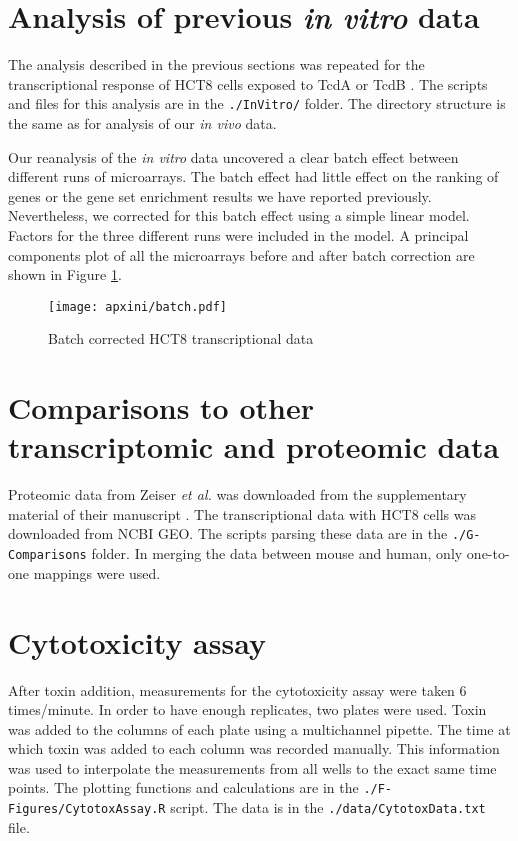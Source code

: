\section{Analysis of previous \emph{in vitro} data}

The analysis described in the previous sections was repeated for the transcriptional
response of HCT8 cells exposed to TcdA or TcdB \cite{DAuria:2012bd}. The scripts and files for this
analysis are in the \texttt{./InVitro/} folder. The directory structure is the same
as for analysis of our \emph{in vivo} data.

Our reanalysis of the \emph{in vitro} data uncovered a clear
batch effect between different runs of microarrays. The batch effect had little
effect on the ranking of genes or the gene set enrichment results we have
reported previously. Nevertheless, we corrected for this batch effect using
a simple linear model. Factors for the three different runs were included in the
model. A principal components plot of all the microarrays before and after 
batch correction are shown in Figure \ref{fig:batch}.

\begin{figure}[ht]
\centering
\texttt{[image: apxini/batch.pdf]}
\caption{Batch corrected HCT8 transcriptional data}
\label{fig:batch}
\end{figure}

\section{Comparisons to other transcriptomic and proteomic data}

Proteomic data from Zeiser \emph{et al.} was downloaded from the supplementary
material of their manuscript \cite{Zeiser:2013cu}. The transcriptional data with HCT8 cells was
downloaded from NCBI GEO. The scripts parsing these data are in the
\texttt{./G-Comparisons} folder. In merging the data between mouse and human, 
only one-to-one mappings were used.

\section{Cytotoxicity assay}

After toxin addition, measurements for the cytotoxicity assay 
were taken 6 times/minute. In order to have enough replicates, 
two plates were used. Toxin was added to the columns of each
plate using a multichannel pipette. The time at which toxin
was added to each column was recorded manually. This information was used
to interpolate the measurements from all wells to the exact same time points. 
The plotting functions
and calculations are in the \texttt{./F-Figures/CytotoxAssay.R} script. The
data is in the \texttt{./data/CytotoxData.txt} file.

